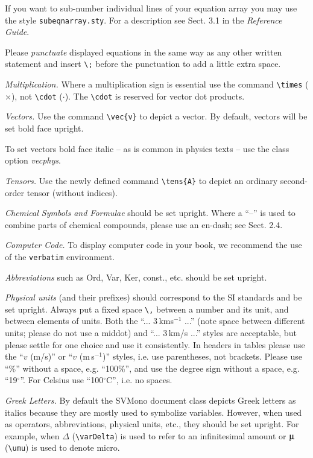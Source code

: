 \documentclass[graybox]{svmono}
\begin{document}
If you want to sub-number individual lines of your equation array you may use the style \verb|subeqnarray.sty|. For a description see Sect. 3.1 in the {\it Reference Guide}.

Please {\it punctuate} displayed equations in the same way as any other written statement and insert \verb|\;| before the punctuation to add a little extra space.


{\it Multiplication.} Where a multiplication sign is essential use the command \verb|\times| ($\times$), not \verb|\cdot| ($\cdot$). The \verb|\cdot| is reserved for vector dot products.

{\it Vectors.} Use the command \verb|\vec{v}| to depict a vector. By default, vectors will be set bold face upright.

To set vectors bold face italic -- as is common in physics texts -- use the class option {\it vecphys}.

{\it Tensors.} Use the newly defined command \verb|\tens{A}| to depict an ordinary second-order tensor (without indices).

{\it Chemical Symbols and Formulae} should be set upright. Where a ``--'' is used to combine parts of chemical compounds, please use an en-dash; see Sect. 2.4.

{\it Computer Code.} To display computer code in your book, we recommend the use of the \verb|verbatim| environment.

{\it Abbreviations} such as Ord, Var, Ker, const., etc. should be set upright.

{\it Physical units} (and their prefixes) should correspond to the SI standards and be set upright. Always put a fixed space \verb|\,| between a number and its unit, and between elements of units. Both the ``... 3\,kms$^{-1}$ ...'' (note space between different units; please do not use a middot) and ``... 3\,km/s ...'' styles are acceptable, but please settle for one choice and use it consistently. In headers in tables please use the ``$v$ (m/s)'' or ``$v$ (m\,s$^{-1}$)'' styles, i.e. use parentheses, not brackets. Please use ``\%'' without a space, e.g. ``100\%'', and use the degree sign without a space, e.g. ``19$^{\circ}$''. For Celsius use ``100$^{\circ}$C'', i.e. no spaces.

{\it Greek Letters.} By default the {\sc SVMono} document class depicts Greek letters as italics because they are mostly used to symbolize variables. However, when used as operators, abbreviations, physical units, etc., they should be set upright. For example, when $\varDelta$ (\verb|\varDelta|) is used to refer to an infinitesimal amount or $\umu$ (\verb|\umu|) is used to denote micro.
\end{document}
